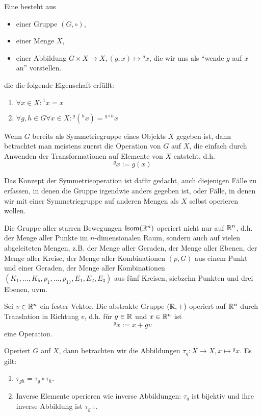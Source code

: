 \begin{definition}
Eine  besteht aus
\begin{itemize}
\item einer Gruppe $(G,\circ)$,
\item einer Menge $X$,
\item einer Abbildung $G\times X\to X, (g,x)\mapsto{^g x}$, die wir uns als \enquote{wende $g$ auf $x$ an} vorstellen.
\end{itemize}
die die folgende Eigenschaft erfüllt:
\begin{enumerate}
\item $\forall x\in X: {^1 x} = x$
\item $\forall g,h\in G \forall x\in X: {^g(^h x)} = {^{g\circ h}x}$
\end{enumerate}
\end{definition}

\begin{example}
Wenn $G$ bereits als Symmetriegruppe eines Objekts $X$ gegeben ist, dann betrachtet man meistens zuerst die Operation von $G$ auf $X$, die einfach durch Anwenden der Transformationen auf Elemente von $X$ entsteht, d.h.
\[{^g x} := g(x)\]

Das Konzept der Symmetrieoperation ist dafür gedacht, auch diejenigen Fälle zu erfassen, in denen die Gruppe irgendwie anders gegeben ist, oder Fälle, in denen wir mit einer Symmetriegruppe auf anderen Mengen als $X$ selbst operieren wollen.
\end{example}

\begin{example}
Die Gruppe aller starren Bewegungen $\operatorname{Isom}(\mathbb{R}^n)$ operiert nicht nur auf $\mathbb{R}^n$, d.h. der Menge aller Punkte im $n$-dimensionalen Raum, sondern auch auf vielen abgeleiteten Mengen, z.B. der Menge aller Geraden, der Menge aller Ebenen, der Menge aller Kreise, der Menge aller Kombinationen $(p,G)$ aus einem Punkt und einer Geraden, der Menge aller Kombinationen $(K_1,\ldots,K_5, p_1,\ldots,p_{17}, E_1,E_2,E_3)$ aus fünf Kreisen, siebzehn Punkten und drei Ebenen, uvm.
\end{example}

\begin{example}
Sei $v\in\mathbb{R}^n$ ein fester Vektor. Die abstrakte Gruppe $(\mathbb{R},+)$ operiert auf $\mathbb{R}^n$ durch Translation in Richtung $v$, d.h. für $g\in\mathbb{R}$ und $x\in\mathbb{R}^n$ ist
\[{^g x} := x+gv\]
eine Operation.
\end{example}

\begin{lemma}[Offensichtliches]
Operiert $G$ auf $X$, dann betrachten wir die Abbildungen $\tau_g: X\to X, x\mapsto {^g x}$. Es gilt:
\begin{enumerate}
\item $\tau_{gh} =\tau_g\circ\tau_h$.
\item Inverse Elemente operieren wie inverse Abbildungen: $\tau_g$ ist bijektiv und ihre inverse Abbildung ist $\tau_{g^{-1}}$.
\end{enumerate}
\end{lemma}

